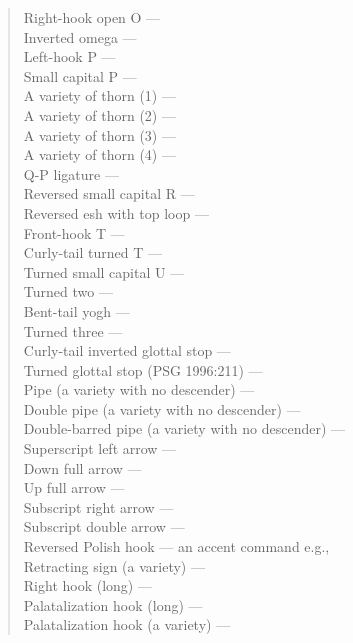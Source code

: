 \begin{quote}
Right-hook open O --- \textrhookopeno\\
Inverted omega --- \textinvomega\\
Left-hook P --- \textlhookp\\
Small capital P --- \textscp\\
A variety of thorn (1) --- \textthornvari\\
A variety of thorn (2) --- \textthornvarii\\
A variety of thorn (3) --- \textthornvariii\\
A variety of thorn (4) --- \textthornvariv\\
Q-P ligature --- \textqplig\\
Reversed small capital R --- \textrevscr\\
Reversed esh with top loop --- \textlooptoprevesh\\
Front-hook T --- \textfrhookt\\
Curly-tail turned T --- \textctturnt\\
Turned small capital U --- \textturnscu\\
Turned two --- \textturntwo\\
Bent-tail yogh --- \textbenttailyogh\\
Turned three --- \textturnthree\\
Curly-tail inverted glottal stop --- \textctinvglotstop\\
Turned glottal stop (PSG 1996:211) --- \textturnglotstop\\
Pipe (a variety with no descender) --- \textpipevar\\
Double pipe (a variety with no descender) --- \textdoublepipevar\\
Double-barred pipe (a variety with no descender) --- \textdoublebarpipevar\\
Superscript left arrow --- \textspleftarrow\\
Down full arrow --- \textdownfullarrow\\
Up full arrow --- \textupfullarrow\\
Subscript right arrow --- \textsubrightarrow\\
Subscript double arrow --- \textsubdoublearrow\\
Reversed Polish hook --- an accent command e.g., \\
Retracting sign (a variety) --- \textretractingvar\\
Right hook (long) --- \textrthooklong\\
Palatalization hook (long) --- \textpalhooklong\\
Palatalization hook (a variety) --- \textpalhookvar
\end{quote}

